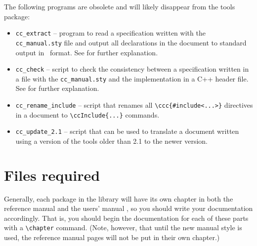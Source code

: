 The following programs are obsolete and will likely disappear from the
tools package:
\begin{itemize}
   \item \verb|cc_extract|%
          -- program to read a specification written with
         the \verb|cc_manual.sty| file and output all declarations in the
         document to standard output in \CC\ format. 
         See  for further explanation.
   \item \verb|cc_check|%
         -- script to check the consistency between a 
         specification written in a  file with the 
         \verb|cc_manual.sty| 
         and the implementation in a C++ header file.  See
         for further explanation.
   \item \verb|cc_rename_include|%
         -- script that renames all 
         \verb|\ccc{#include<...>}| directives in a document to 
         \verb|\ccInclude{...}| commands.  
   \item \verb|cc_update_2.1|%
         -- script that can be used to translate a 
         document written using a version of the tools older than 2.1
         to the newer version. 
\end{itemize}
\ccModifierCrossRefOn

\section{Files required}
\label{sec:files_required}

Generally, each package in the library will have its own chapter in
both the reference manual and the users' manual%
%
, so you should write
your documentation accordingly.  That is, you should begin the documentation
for each of these parts with a \verb|\chapter| command. (Note, however, that
until the new manual style is used, the reference manual pages will not be 
put in their own chapter.)

